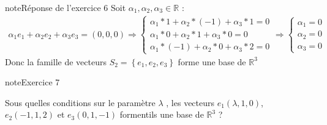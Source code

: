 \documentclass[letterpaper,10pt,french]{jupyterBook}
\begin{document}
\begin{sphinxadmonition}{note}{Réponse de l’exercice 6}
\sphinxAtStartPar
Soit \(\alpha_1, \alpha_2,\alpha_3 \in \mathbb{R}\) :
\begin{equation*}
\begin{split}
\alpha_1 e_1 + \alpha_2 e_2 + \alpha_3 e_3= (0,0,0) \Rightarrow 
    \begin{cases}
      \alpha_1*1+ \alpha_2* (-1) +\alpha_3*1= 0 \\
      \alpha_1*0 + \alpha_2*1 + \alpha_3*0= 0 \\
      \alpha_1*(-1) + \alpha_2*0 + \alpha_3*2= 0 
      \end{cases}
\Rightarrow        
       \begin{cases}
      \alpha_1 = 0 \\
      \alpha_2 = 0 \\
      \alpha_3 = 0 
      \end{cases}
\end{split}
\end{equation*}
\sphinxAtStartPar
Donc la famille de vecteurs \(S_2 = \left\{  e_1, e_2, e_3 \right\} \) forme une base de \(\mathbb{R}^3\)
\end{sphinxadmonition}

\begin{sphinxadmonition}{note}{Exercice 7}

\sphinxAtStartPar
Sous quelles conditions sur le paramètre \(\lambda\) , les vecteurs \(e_1(\lambda, 1,0)\),  \(e_2(-1,1, 2)\) et
\(e_3(0, 1, -1)\) forment\sphinxhyphen{}ils une base de \(\mathbb{R}^3\) ?
\end{sphinxadmonition}
\end{document}
